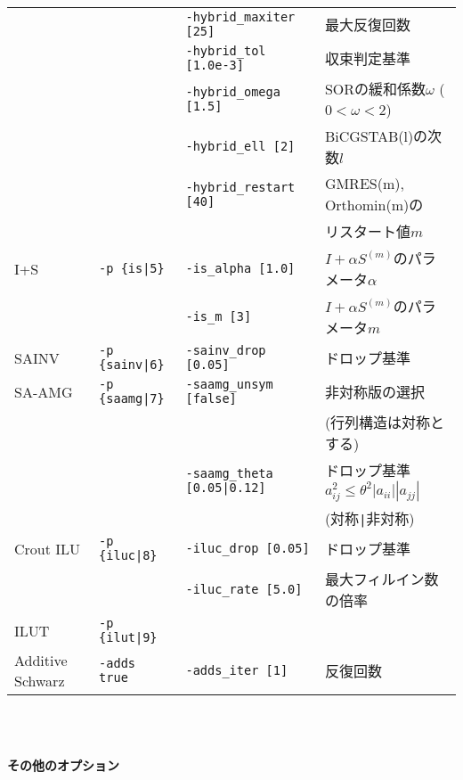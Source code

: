 \documentclass[a4paper]{jarticle}
\begin{document}
{{\begin{minipage}[t]{\textwidth}
\begin{center}
\begin{tabular}{l|lll}
         &                       & \verb=-hybrid_maxiter [25]= & 最大反復回数 \\
         &                       & \verb=-hybrid_tol [1.0e-3]= & 収束判定基準 \\
         &                       & \verb=-hybrid_omega [1.5]=  & SORの緩和係数$\omega$ ($0<\omega<2$) \\
         &                       & \verb=-hybrid_ell [2]=      & BiCGSTAB(l)の次数$l$\\
         &                       & \verb=-hybrid_restart [40]= & GMRES(m), Orthomin(m)の \\
         &                       &                             & リスタート値$m$ \\
I+S      & \verb=-p {is|5}=      & \verb=-is_alpha [1.0]=  & $I+\alpha S^{(m)}$のパラメータ$\alpha$ \\
         &                       & \verb=-is_m [3]=        & $I+\alpha S^{(m)}$のパラメータ$m$ \\
SAINV    & \verb=-p {sainv|6}=   & \verb=-sainv_drop [0.05]=    & ドロップ基準\\
SA-AMG   & \verb=-p {saamg|7}=   & \verb=-saamg_unsym [false]=     & 非対称版の選択 \\
         &                       &                                 & (行列構造は対称とする) \\
         &                       & \verb=-saamg_theta [0.05|0.12]= & ドロップ基準 $a^2_{ij}\le\theta^2|a_{ii}||a_{jj}|$ \\
         &                       &                             & (対称\verb=|=非対称) \\
Crout ILU& \verb=-p {iluc|8}=    & \verb=-iluc_drop [0.05]=    & ドロップ基準    \\
         &                       & \verb=-iluc_rate [5.0]=     & 最大フィルイン数の倍率 \\
ILUT     & \verb=-p {ilut|9}=    &     \\
Additive Schwarz  & \verb=-adds true=   &  \verb=-adds_iter [1]= & 反復回数   \\
\hline         
\end{tabular}
\end{center}
\end{minipage}
\\ \\
\begin{minipage}[t]{\textwidth}
\begin{center}
{\bf その他のオプション}\\

\end{center}
\end{minipage}}}
\end{document}
